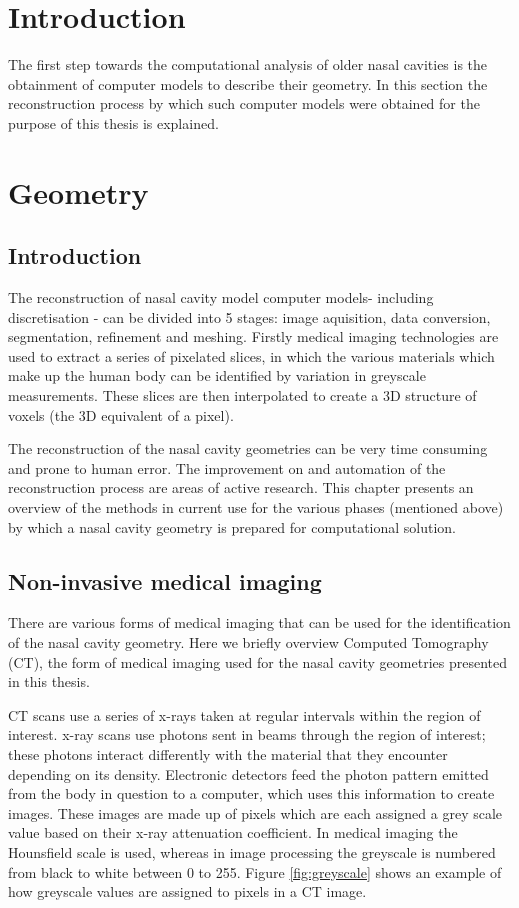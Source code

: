 \section{Introduction}

The first step towards the computational analysis of older nasal cavities is the obtainment of computer models to describe their geometry. In this section the reconstruction process by which such computer models were obtained for the purpose of this thesis is explained.

\section{Geometry}
\subsection{Introduction}

The reconstruction of nasal cavity model computer models- including discretisation - can be divided into 5 stages: image aquisition, data conversion, segmentation, refinement and meshing. Firstly medical imaging technologies are used to extract a series of pixelated slices, in which the various materials which make up the human body can be identified by variation in greyscale measurements. These slices are then interpolated to create a 3D structure of voxels (the 3D equivalent of a pixel).

The reconstruction of the nasal cavity geometries can be very time consuming and prone to human error. The improvement on and automation of the reconstruction process are areas of active research. This chapter presents an overview of the methods in current use for the various phases (mentioned above) by which a nasal cavity geometry is prepared for computational solution.

\subsection{Non-invasive medical imaging}

There are various forms of medical imaging that can be used for the identification of the nasal cavity geometry. Here we briefly overview Computed Tomography (CT), the form of medical imaging used for the nasal cavity geometries presented in this thesis.

CT scans use a series of x-rays taken at regular intervals within the region of interest. x-ray scans use photons sent in beams through the region of interest; these photons interact differently with the material that they encounter depending on its density. Electronic detectors feed the photon pattern emitted from the body in question to a computer, which uses this information to create images. These images are made up of pixels which are each assigned a grey scale value based on their x-ray attenuation coefficient. In medical imaging the Hounsfield scale is used, whereas in image processing the greyscale is numbered from black to white between 0 to 255. Figure \ref{fig:greyscale} shows an  example of how greyscale values are assigned to pixels in a CT image.

